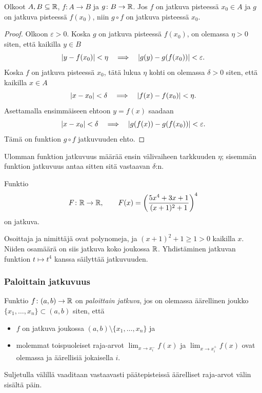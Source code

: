 \documentclass[11pt,a4paper]{amsart}
\begin{document}
\begin{theorem}
  Olkoot $A,B\subseteq\mathbb{R}$, $f\colon A\to B$ ja $g\colon B\to\mathbb{R}$.
  Jos $f$ on jatkuva pisteessä $x_0\in A$ ja $g$ on jatkuva
  pisteessä $f(x_0)$, niin $g\circ f$ on jatkuva pisteessä $x_0$.
\end{theorem}
\begin{proof}
  Olkoon $\varepsilon>0$.
  Koska $g$ on jatkuva pisteessä $f(x_0)$, on olemassa $\eta>0$
  siten, että kaikilla $y\in B$
  \[
    \lvert y-f(x_0)\rvert<\eta
    \quad\Longrightarrow\quad
    \lvert g(y)-g(f(x_0))\rvert<\varepsilon.
  \]
  Koska $f$ on jatkuva pisteessä $x_0$, tätä lukua $\eta$ kohti
  on olemassa $\delta>0$ siten, että kaikilla $x\in A$
  \[
    \lvert x-x_0\rvert<\delta
    \quad\Longrightarrow\quad
    \lvert f(x)-f(x_0)\rvert<\eta.
  \]
  Asettamalla ensimmäiseen ehtoon $y=f(x)$ saadaan
  \[
    \lvert x-x_0\rvert<\delta
    \quad\Longrightarrow\quad
    \lvert g(f(x))-g(f(x_0))\rvert<\varepsilon.
  \]
  Tämä on funktion $g\circ f$ jatkuvuuden ehto.
\end{proof}

Ulomman funktion jatkuvuus määrää ensin välivaiheen tarkkuuden
$\eta$; sisemmän funktion jatkuvuus antaa sitten sitä vastaavan $\delta$:n.

\begin{example}
  Funktio
  \[
    F\colon\mathbb{R}\to\mathbb{R},\qquad
    F(x)=\left(\frac{5x^4+3x+1}{(x+1)^2+1}\right)^4
  \]
  on jatkuva.
\end{example}
\begin{solution}
  Osoittaja ja nimittäjä ovat polynomeja, ja
  $(x+1)^2+1\ge1>0$ kaikilla $x$. Niiden osamäärä on siis jatkuva
  koko joukossa $\mathbb{R}$. Yhdistäminen jatkuvan funktion $t\mapsto t^4$
  kanssa säilyttää jatkuvuuden.
\end{solution}

\newpage
\subsubsection*{Paloittain jatkuvuus}

\begin{definition}
  Funktio $f\colon(a,b)\to\mathbb{R}$ on \emph{paloittain jatkuva},
  jos on olemassa äärellinen joukko
  $\{x_1,\ldots,x_n\}\subset(a,b)$ siten, että
  \begin{itemize}
    \item $f$ on jatkuva joukossa $(a,b)\setminus\{x_1,\ldots,x_n\}$ ja
    \item molemmat toispuoleiset raja-arvot
      $\lim_{x\to x_i^-}f(x)$ ja $\lim_{x\to x_i^+}f(x)$
      ovat olemassa ja äärellisiä jokaisella $i$.
  \end{itemize}
  Suljetulla välillä vaaditaan vastaavasti päätepisteissä
  äärelliset raja-arvot välin sisältä päin.
\end{definition}
\end{document}
